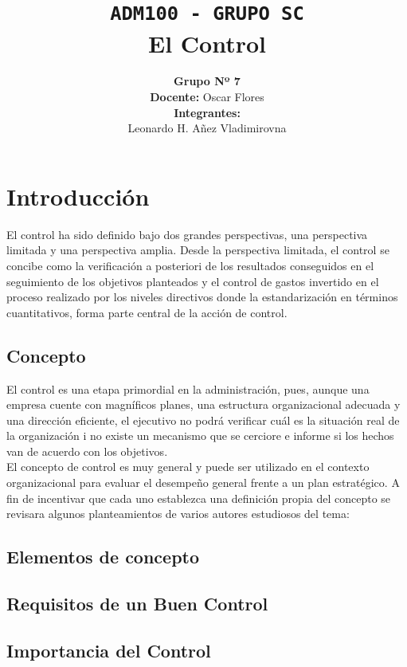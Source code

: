 \documentclass[10pt,letterpaper]{book}
\author{
{\Large \textbf{Grupo Nº 7}}\\${ }$\\
\textbf{Docente:} Oscar Flores \\${ }$\\
\textbf{Integrantes:}\\
Leonardo H. Añez Vladimirovna
}
\title{
{\large \texttt{ADM100 - GRUPO SC}}\\\vspace{3cm}
{\Huge El Control}
}
\begin{document}
\maketitle
\tableofcontents

\newpage

\section{Introducción}
El control ha sido definido bajo dos grandes perspectivas, una perspectiva limitada y una perspectiva amplia. Desde la perspectiva limitada, el control se concibe como la verificación a posteriori de los resultados conseguidos en el seguimiento de los objetivos planteados y el control de gastos invertido en el proceso realizado por los niveles directivos donde la estandarización en términos cuantitativos, forma parte central de la acción de control.
\subsection{Concepto}
El control es una etapa primordial en la administración, pues, aunque una empresa cuente con magníficos planes, una estructura organizacional adecuada y una dirección eficiente, el ejecutivo no podrá verificar cuál es la situación real de la organización i no existe un mecanismo que se cerciore e informe si los hechos van de acuerdo con los objetivos.\\${ }$\\
El concepto de control es muy general y puede ser utilizado en el contexto organizacional para evaluar el desempeño general frente a un plan estratégico.
A fin de incentivar que cada uno establezca una definición propia del concepto se revisara algunos planteamientos de varios autores estudiosos del tema:
\subsection{Elementos de concepto}
\subsection{Requisitos de un Buen Control}
\subsection{Importancia del Control}
\end{document}

